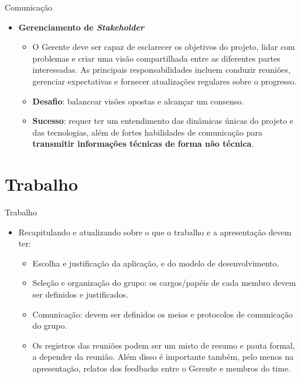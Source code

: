 \documentclass{beamer}
\begin{document}
\begin{frame}{Comunicação}
	\begin{itemize}
		\justifying
		\item \textbf{Gerenciamento de \textit{Stakeholder}}
		\begin{itemize}
			\justifying
			\item O Gerente deve ser capaz de esclarecer os objetivos do projeto, lidar com problemas e criar uma visão compartilhada entre as diferentes partes interessadas. As principais responsabilidades incluem conduzir reuniões, gerenciar expectativas e fornecer atualizações regulares sobre o progresso.
			\item \textbf{Desafio}: balancear visões opostas e alcançar um consenso.
			\item \textbf{Sucesso}: requer ter um entendimento das dinâmicas únicas do projeto e das tecnologias, além de fortes habilidades de comunicação para \textbf{transmitir informações técnicas de forma não técnica}.
		\end{itemize}
	\end{itemize}
\end{frame}


\section{Trabalho}

\begin{frame}{Trabalho}
	\begin{itemize}
		\justifying
		\item Recapitulando e atualizando sobre o que o trabalho e a apresentação devem ter:
			\begin{itemize}
				\justifying
				\item Escolha e justificação da aplicação, e do modelo de desenvolvimento.
				\item Seleção e organização do grupo: os cargos/papéis de cada membro devem ser definidos e justificados.
				\item Comunicação: devem ser definidos os meios e protocolos de comunicação do grupo.
				\item Os registros das reuniões podem ser um misto de resumo e pauta formal, a depender da reunião. Além disso é importante também, pelo menos na apresentação, relatos dos feedbacks entre o Gerente e membros do time.
			\end{itemize}
	\end{itemize}
\end{frame}
\end{document}
